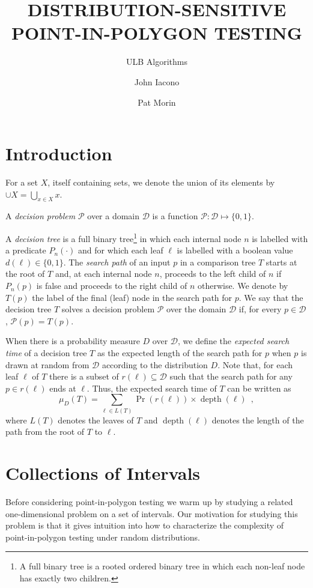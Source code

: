 \documentclass[charterfonts,lotsofwhite]{patmorin}
\title{\MakeUppercase{Distribution-Sensitive Point-in-Polygon Testing}}
\author{ULB Algorithms \and John Iacono \and Pat Morin}
\date{}
\DeclareMathOperator{\depth}{depth}
\begin{document}
\maketitle

\section{Introduction}


For a set $X$, itself containing sets, we denote the union of its
elements by $\cup X=\bigcup_{x\in X} x$.

A \emph{decision problem} $\mathcal{P}$ over a domain $\mathcal{D}$ is
a function $\mathcal{P}:\mathcal{D}\mapsto \{0,1\}$.

A \emph{decision tree} is a full binary tree\footnote{A full binary
tree is a rooted ordered binary tree in which each non-leaf node has
exactly two children.} in which each internal node $n$ is labelled
with a predicate $P_n(\cdot)$ and for which each leaf $\ell$ is
labelled with a boolean value $d(\ell)\in\{0,1\}$. The \emph{search
path} of an input $p$ in a comparison tree $T$ starts at the root of
$T$ and, at each internal node $n$, proceeds to the left child of $n$
if $P_n(p)$ is false and proceeds to the right child of $n$ otherwise.
We denote by $T(p)$ the label of the final (leaf) node in the search
path for $p$.  We say that the decision tree $T$ solves a decision
problem $\mathcal{P}$ over the domain $\mathcal{D}$ if, for every $p\in
\mathcal{D}$, $\mathcal{P}(p)=T(p)$.

When there is a probability measure $D$ over $\mathcal{D}$, we define
the \emph{expected search time} of a decision tree $T$ as the expected
length of the search path for $p$ when $p$ is drawn at random from
$\mathcal{D}$ according to the distribution $D$.  Note that, for each
leaf $\ell$ of $T$ there is a subset of $r(\ell)\subseteq \mathcal{D}$
such that the search path for any $p\in r(\ell)$ ends at $\ell$.
Thus, the expected search time of $T$ can be written as
\[
     \mu_D(T) = \sum_{\ell\in L(T)} \Pr(r(\ell))\times \depth(\ell)
	\enspace ,
\]
where $L(T)$ denotes the leaves of $T$ and $\depth(\ell)$ denotes the
length of the path from the root of $T$ to $\ell$.


\section{Collections of Intervals}

Before considering point-in-polygon testing we warm up by studying a
related one-dimensional problem on a set of intervals.  Our motivation
for studying this problem is that it gives intuition into how to
characterize the complexity of point-in-polygon testing under random
distributions.
\end{document}

